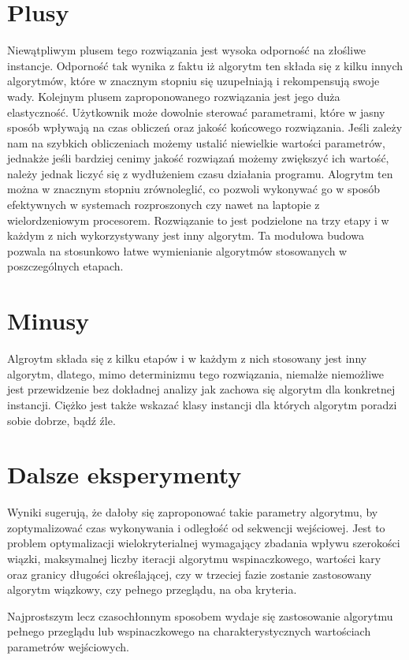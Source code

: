 \documentclass{article}
\begin{document}
\section{Plusy}
Niewątpliwym plusem tego rozwiązania jest wysoka odporność na złośliwe instancje. Odporność tak wynika z faktu iż algorytm ten składa się z kilku innych algorytmów, które w znacznym stopniu się uzupełniają i rekompensują swoje wady.
Kolejnym plusem zaproponowanego rozwiązania jest jego duża elastyczność. Użytkownik może dowolnie sterować parametrami, które w jasny sposób wpływają na czas obliczeń oraz jakość końcowego rozwiązania. Jeśli zależy nam na szybkich obliczeniach możemy ustalić niewielkie wartości parametrów, jednakże jeśli bardziej cenimy jakość rozwiązań możemy zwiększyć ich wartość, należy jednak liczyć się z wydłużeniem czasu działania programu.
Alogrytm ten można w znacznym stopniu zrównoleglić, co pozwoli wykonywać go w sposób efektywnych w systemach rozproszonych czy nawet na laptopie z wielordzeniowym procesorem.
Rozwiązanie to jest podzielone na trzy etapy i w każdym z nich wykorzystywany jest inny algorytm. Ta modułowa budowa pozwala na stosunkowo łatwe wymienianie algorytmów stosowanych w poszczególnych etapach.
\section{Minusy}
Algroytm składa się z kilku etapów i w każdym z nich stosowany jest inny algorytm, dlatego, mimo determinizmu tego rozwiązania, niemalże niemożliwe jest przewidzenie bez dokładnej analizy jak zachowa się algorytm dla konkretnej instancji. Ciężko jest także wskazać klasy instancji dla których algorytm poradzi sobie dobrze, bądź źle.


\section{Dalsze eksperymenty}

Wyniki sugerują, że dałoby się zaproponować takie parametry algorytmu, by zoptymalizować czas wykonywania i odległość od sekwencji wejściowej.
Jest to problem optymalizacji wielokryterialnej wymagający zbadania wpływu szerokości wiązki, maksymalnej liczby iteracji algorytmu wspinaczkowego, wartości kary oraz granicy długości określającej, czy w trzeciej fazie zostanie zastosowany algorytm wiązkowy, czy pełnego przeglądu, na oba kryteria.

Najprostszym lecz czasochłonnym sposobem wydaje się zastosowanie algorytmu pełnego przeglądu lub wspinaczkowego na charakterystycznych wartościach parametrów wejściowych.
\end{document}
